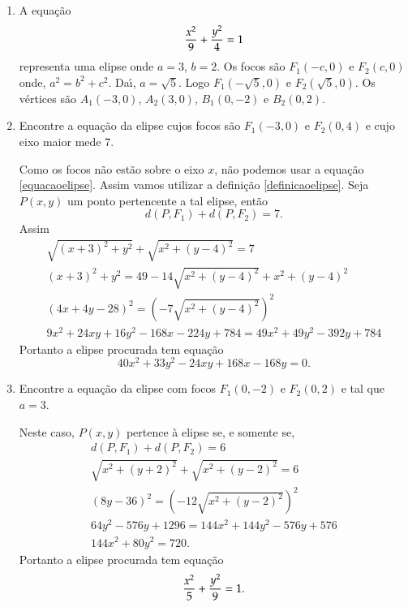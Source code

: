 \begin{exemplos}
  \begin{enumerate}
    \item A equa\c{c}\~ao
    \[
      \dfrac{x^2}{9} + \dfrac{y^2}{4} = 1
    \]
    representa uma elipse onde $a = 3$, $b = 2$. Os focos s\~ao $F_1(-c,0)$ e $F_2(c,0)$ onde, $a^2 = b^2 + c^2$. Da{\'\i}, $a = \sqrt{5}$. Logo $F_1(-\sqrt{5},0)$ e $F_2(\sqrt{5},0)$. Os v\'ertices s\~ao $A_1(-3,0)$, $A_2(3,0)$, $B_1(0,-2)$ e $B_2(0,2)$.
    \item Encontre a equa\c{c}\~ao da elipse cujos focos s\~ao $F_1(-3,0)$ e $F_2(0,4)$ e cujo eixo maior mede 7.
    \begin{solucao}
      Como os focos n\~ao est\~ao sobre o eixo $x$, n\~ao podemos usar a equa\c{c}\~ao \eqref{equacaoelipse}. Assim vamos utilizar a defini\c{c}\~ao \eqref{definicaoelipse}. Seja $P(x,y)$ um ponto pertencente a tal elipse, ent\~ao
      \[
        d(P,F_1) + d(P,F_2) = 7.
      \]
      Assim
      \begin{align*}
        \sqrt{(x + 3)^2 + y^2} + \sqrt{x^2 + (y - 4)^2} = 7\\
        (x+ 3)^2 + y^2 = 49 - 14\sqrt{x^2 + (y - 4)^2} + x^2 + (y - 4)^2\\
        (4x + 4y - 28)^2 = (-7\sqrt{x^2 + (y - 4)^2})^2\\
        9x^2 + 24xy + 16y^2 - 168x - 224y + 784 = 49x^2 + 49y^2 - 392y + 784
      \end{align*}
      Portanto a elipse procurada tem equa\c{c}\~ao
      \[
        40x^2 + 33y^2 - 24xy + 168x - 168y = 0.
      \]
    \end{solucao}
    \item Encontre a equa\c{c}\~ao da elipse com focos $F_1(0,-2)$ e $F_2(0,2)$ e tal que $a = 3$.
    \begin{solucao}
      Neste caso, $P(x,y)$ pertence \`a elipse se, e somente se,
      \begin{align*}
        d(P,F_1) + d(P,F_2) = 6\\
        \sqrt{x^2 + (y + 2)^2} + \sqrt{x^2 + (y - 2)^2} = 6\\
        (8y - 36)^2 = (-12\sqrt{x^2 + (y - 2)^2})^2\\
        64y^2 - 576y + 1296 = 144x^2 + 144y^2 - 576y + 576\\
        144x^2 + 80y^2 = 720.
      \end{align*}
      Portanto a elipse procurada tem equa\c{c}\~ao
      \[
        \dfrac{x^2}{5} + \dfrac{y^2}{9} = 1.
      \]

    \end{solucao}
  \end{enumerate}
\end{exemplos}


